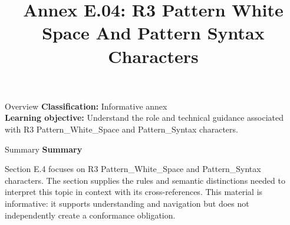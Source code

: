 \documentclass[10pt,letterpaper]{article}
\title{Annex E.04: R3 Pattern White Space And Pattern Syntax Characters}
\author{}
\date{}
\begin{document}
\maketitle
\begin{CornellOverviewBox}{Overview}
\textbf{Classification:} Informative annex\\[2pt]
\textbf{Learning objective:} Understand the role and technical guidance associated with R3 Pattern\_White\_Space and Pattern\_Syntax characters.
\end{CornellOverviewBox}\begin{CornellSummaryBox}{Summary}
{\sffamily\bfseries\color{Accent} Summary}\par\vspace{3pt}Section E.4 focuses on R3 Pattern\_White\_Space and Pattern\_Syntax characters. The section supplies the rules and semantic distinctions needed to interpret this topic in context with its cross-references. This material is informative: it supports understanding and navigation but does not independently create a conformance obligation.
\end{CornellSummaryBox}
\end{document}
